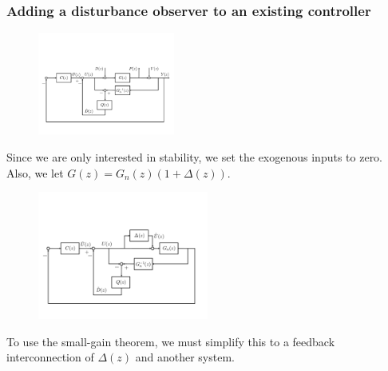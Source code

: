 \begin{frame}
    \frametitle{Adding a disturbance observer to an existing controller}

    \begin{figure}
        \includegraphics[width=0.4\textwidth]{Disturbance_Observer_multi2}
    \end{figure}
    Since we are only interested in stability, we set the exogenous inputs to zero. Also, we let $G(z) = G_n(z) ( 1 + \Delta(z))$.
    \pause
    \begin{figure}
        \includegraphics[width=0.5\textwidth]{Disturbance_Observer_multi3}
    \end{figure}
    \pause

    To use the small-gain theorem, we must simplify this to a feedback interconnection of $\Delta(z)$ and another system.

\end{frame}

